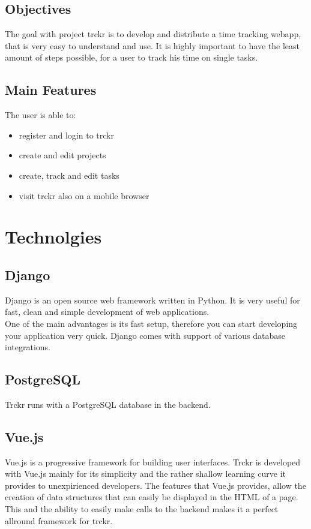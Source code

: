 \documentclass[a4paper, 12pt, headsepline]{scrartcl}
\begin{document}
\subsection{Objectives}
The goal with project trckr is to develop and distribute a time tracking webapp, that is very easy to understand and use. It is highly important to
have the least amount of steps possible, for a user to track his time on single tasks.

\subsection{Main Features}
The user is able to:
\begin{itemize}
    \item register and login to trckr
    \item create and edit projects
    \item create, track and edit tasks
    \item visit trckr also on a mobile browser
\end{itemize}


\section{Technolgies}


\subsection{Django}
Django is an open source web framework written in Python. It is very useful for fast, clean and simple development of web applications.\\
One of the main advantages is its fast setup, therefore you can start developing your application very quick.
Django comes with support of various database integrations.

\subsection{PostgreSQL}
Trckr runs with a PostgreSQL database in the backend.

\subsection{Vue.js}
Vue.js is a progressive framework for building user interfaces. Trckr is developed with Vue.js mainly for its simplicity and the rather shallow learning curve it provides to unexpirienced developers. 
The features that Vue.js provides, allow the creation of data structures that can easily be displayed in the HTML of a page. This and the ability to easily make calls to the backend makes it a perfect allround framework for trckr.
\end{document}
